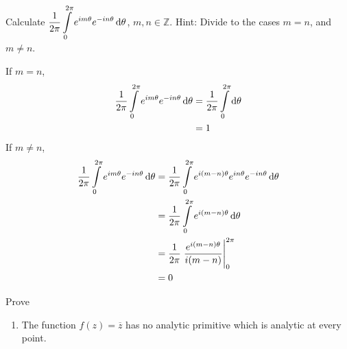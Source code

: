 \documentclass[fleqn, a4paper, 11pt, oneside]{amsart}
\theoremstyle{definition}
\theoremstyle{theorem}
\begin{document}
\setcounter{question}{1}
\begin{question}
	Calculate $\displaystyle \frac{1}{2 \pi} \int\limits_{0}^{2 \pi} e^{i m \theta} e^{-i n \theta} \dif \theta$, $m,n \in \mathbb{Z}$.
	Hint: Divide to the cases $m = n$, and $m \neq n$.
\end{question}

\begin{solution}
	If $m = n$,
	\begin{align*}
		\frac{1}{2 \pi} \int\limits_{0}^{2 \pi} e^{i m \theta} e^{-i n \theta} \dif \theta & = \frac{1}{2 \pi} \int\limits_{0}^{2 \pi} \dif \theta \\
                                                                                                   & = 1
	\end{align*}
	If $m \neq n$,
	\begin{align*}
		\frac{1}{2 \pi} \int\limits_{0}^{2 \pi} e^{i m \theta} e^{-i n \theta} \dif \theta & = \frac{1}{2 \pi} \int\limits_{0}^{2 \pi} e^{i (m - n) \theta} e^{i n \theta} e^{-i n \theta} \dif \theta \\
                                                                                                   & = \frac{1}{2 \pi} \int\limits_{0}^{2 \pi} e^{i (m - n) \theta} \dif \theta                                \\
                                                                                                   & = \frac{1}{2 \pi} \left. \frac{e^{i (m - n) \theta}}{i (m - n)} \right|_{0}^{2 \pi}                       \\
                                                                                                   & = 0
	\end{align*}
\end{solution}

\setcounter{question}{2}
\begin{question}
	Prove
	\begin{enumerate}
		\setcounter{enumi}{0}
		\item
			The function $f(z) = \overline{z}$ has no analytic primitive which is analytic at every point.
	\end{enumerate}
\end{question}
\end{document}
